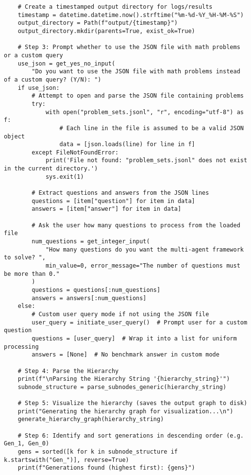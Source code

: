 \begin{lstlisting}
    # Create a timestamped output directory for logs/results
    timestamp = datetime.datetime.now().strftime("%m-%d-%Y_%H-%M-%S")
    output_directory = Path(f"output/{timestamp}")
    output_directory.mkdir(parents=True, exist_ok=True)

    # Step 3: Prompt whether to use the JSON file with math problems or a custom query
    use_json = get_yes_no_input(
        "Do you want to use the JSON file with math problems instead of a custom query? (Y/N): ")
    if use_json:
        # Attempt to open and parse the JSON file containing problems
        try:
            with open("problem_sets.jsonl", "r", encoding="utf-8") as f:
                # Each line in the file is assumed to be a valid JSON object
                data = [json.loads(line) for line in f]
        except FileNotFoundError:
            print('File not found: "problem_sets.jsonl" does not exist in the current directory.')
            sys.exit(1)

        # Extract questions and answers from the JSON lines
        questions = [item["question"] for item in data]
        answers = [item["answer"] for item in data]

        # Ask the user how many questions to process from the loaded file
        num_questions = get_integer_input(
            "How many questions do you want the multi-agent framework to solve? ",
            min_value=0, error_message="The number of questions must be more than 0."
        )
        questions = questions[:num_questions]
        answers = answers[:num_questions]
    else:
        # Custom user query mode if not using the JSON file
        user_query = initiate_user_query()  # Prompt user for a custom question
        questions = [user_query]  # Wrap it into a list for uniform processing
        answers = [None]  # No benchmark answer in custom mode

    # Step 4: Parse the Hierarchy
    print(f"\nParsing the Hierarchy String '{hierarchy_string}'")
    subnode_structure = parse_subnodes_generic(hierarchy_string)

    # Step 5: Visualize the hierarchy (saves the output graph to disk)
    print("Generating the hierarchy graph for visualization...\n")
    generate_hierarchy_graph(hierarchy_string)

    # Step 6: Identify and sort generations in descending order (e.g. Gen_1, Gen_0)
    gens = sorted([k for k in subnode_structure if k.startswith("Gen_")], reverse=True)
    print(f"Generations found (highest first): {gens}")


\end{lstlisting}
